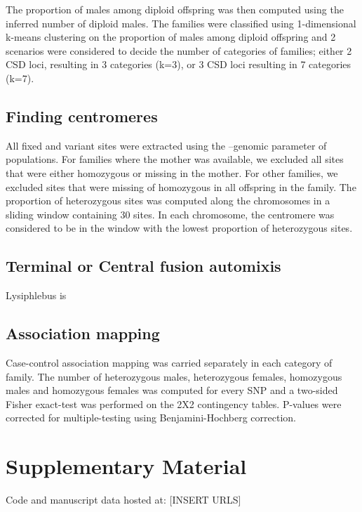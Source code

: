 \documentclass[11pt,a4paper]{report}
\begin{document}
The proportion of males among diploid offspring was then computed using the inferred number of diploid males. The families were classified using 1-dimensional k-means clustering on the proportion of males among diploid offspring and 2 scenarios were considered to decide the number of categories of families; either 2 CSD loci, resulting in 3 categories (k=3), or 3 CSD loci resulting in 7 categories (k=7).\\

\subsection*{Finding centromeres}
All fixed and variant sites were extracted using the --genomic parameter of populations. For families where the mother was available, we excluded all sites that were either homozygous or missing in the mother. For other families, we excluded sites that were missing of homozygous in all offspring in the family. 
The proportion of heterozygous sites was computed along the chromosomes in a sliding window containing 30 sites. In each chromosome, the centromere was considered to be in the window with the lowest proportion of heterozygous sites.

\subsection*{Terminal or Central fusion automixis}
Lysiphlebus is 

\subsection*{Association mapping}
Case-control association mapping was carried separately in each category of family. The number of heterozygous males, heterozygous females, homozygous males and homozygous females was computed for every SNP and a two-sided Fisher exact-test was performed on the 2X2 contingency tables. P-values were corrected for multiple-testing using Benjamini-Hochberg correction. 
\section*{Supplementary Material}

Code and manuscript data hosted at: [INSERT URLS]


\fancyhead[L]{\slshape }

\end{document}
